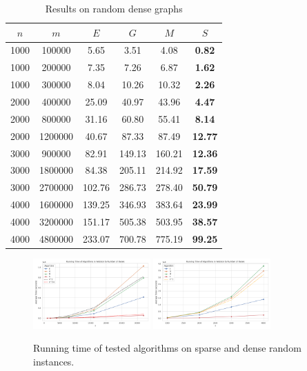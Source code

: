 \begin{table}
\centering
\begin{tabular}{
cc|cccc}
$n$ & $m$ & $E$ & $G$ & $M$ & $S$ \\
\hline
1000 & 100000 & 5.65 & 3.51 & 4.08 & \textbf{0.82} \\
1000 & 200000 & 7.35 & 7.26 & 6.87 & \textbf{1.62} \\
1000 & 300000 & 8.04 & 10.26 & 10.32 & \textbf{2.26} \\
2000 & 400000 & 25.09 & 40.97 & 43.96 & \textbf{4.47} \\
2000 & 800000 & 31.16 & 60.80 & 55.41 & \textbf{8.14} \\
2000 & 1200000 & 40.67 & 87.33 & 87.49 & \textbf{12.77} \\
3000 & 900000 & 82.91 & 149.13 & 160.21 & \textbf{12.36} \\
3000 & 1800000 & 84.38 & 205.11 & 214.92 & \textbf{17.59} \\
3000 & 2700000 & 102.76 & 286.73 & 278.40 & \textbf{50.79} \\
4000 & 1600000 & 139.25 & 346.93 & 383.64 & \textbf{23.99} \\
4000 & 3200000 & 151.17 & 505.38 & 503.95 & \textbf{38.57} \\
4000 & 4800000 & 233.07 & 700.78 & 775.19 & \textbf{99.25} \\
\end{tabular}
\caption{Results on random dense graphs}\label{tab:dense}
\end{table}

\begin{figure}[b]
    \centering
    \includegraphics*[width=0.4\textwidth]{figures/sparse.png}
    \includegraphics*[width=0.4\textwidth]{figures/dense.png}
    \caption{Running time of tested algorithms on sparse and dense random instances.}\label{fig:sparse_dense}
\end{figure}

